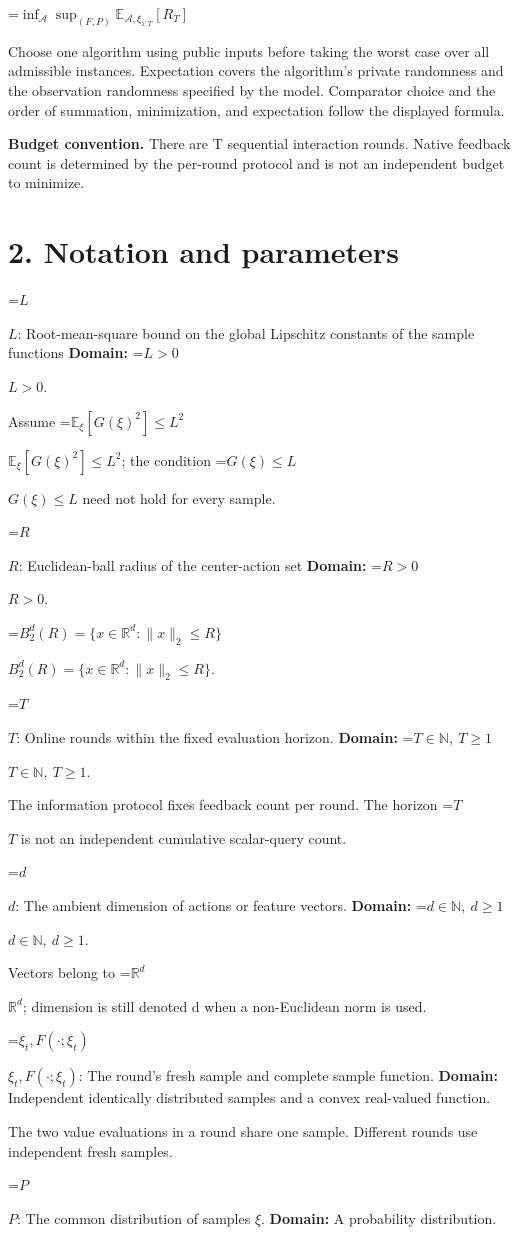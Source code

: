 \documentclass[10pt,a4paper]{article}
\newcommand{\AtlasMath}[1]{\par\begingroup\centering\setbox0=\hbox{$\displaystyle #1$}\ifdim\wd0>1.4\linewidth\typeout{ATLAS WIDE FORMULA: \the\wd0}\fi\ifdim\wd0>\linewidth\resizebox{\linewidth}{!}{\box0}\else\box0\fi\par\endgroup}
\newcommand{\AtlasInlineMath}[1]{\begingroup\setbox0=\hbox{$#1$}\ifdim\wd0>.4\linewidth\endgroup\AtlasMath{#1}\else\endgroup$#1$\fi}
\begin{document}
\AtlasMath{\inf_{\mathcal{A}}\sup_{(F,P)}\mathbb{E}_{\mathcal{A},\xi_{1:T}}[R_T]}


Choose one algorithm using public inputs before taking the worst case over all admissible instances. Expectation covers the algorithm's private randomness and the observation randomness specified by the model. Comparator choice and the order of summation, minimization, and expectation follow the displayed formula.

\textbf{Budget convention.} There are T sequential interaction rounds. Native feedback count is determined by the per-round protocol and is not an independent budget to minimize.

\section{2. Notation and parameters}
\AtlasInlineMath{L}: Root-mean-square bound on the global Lipschitz constants of the sample functions \textbf{Domain:} \AtlasInlineMath{L>0}.

Assume \AtlasInlineMath{\mathbb E_{\xi}[G(\xi)^2]\le L^2}; the condition \AtlasInlineMath{G(\xi)\le L} need not hold for every sample.

\AtlasInlineMath{R}: Euclidean-ball radius of the center-action set \textbf{Domain:} \AtlasInlineMath{R>0}.

\AtlasInlineMath{B_2^d(R)=\{x\in\mathbb R^d:\|x\|_2\le R\}}.

\AtlasInlineMath{T}: Online rounds within the fixed evaluation horizon. \textbf{Domain:} \AtlasInlineMath{T\in\mathbb N,\ T\ge1}.

The information protocol fixes feedback count per round. The horizon \AtlasInlineMath{T} is not an independent cumulative scalar-query count.

\AtlasInlineMath{d}: The ambient dimension of actions or feature vectors. \textbf{Domain:} \AtlasInlineMath{d\in\mathbb N,\ d\ge1}.

Vectors belong to \AtlasInlineMath{\mathbb R^d}; dimension is still denoted d when a non-Euclidean norm is used.

\AtlasInlineMath{\xi_t,F(\cdot;\xi_t)}: The round’s fresh sample and complete sample function. \textbf{Domain:} Independent identically distributed samples and a convex real-valued function.

The two value evaluations in a round share one sample. Different rounds use independent fresh samples.

\AtlasInlineMath{P}: The common distribution of samples $\xi$. \textbf{Domain:} A probability distribution.
\end{document}
